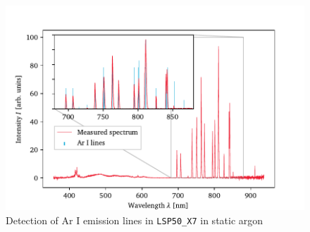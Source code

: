         \begin{figure}[h]
            \centering
            \includegraphics[]{assets/5 results/spectrum_LSP50_X7_lines}
            \caption{Detection of Ar I emission lines in \texttt{LSP50\_X7} in static argon}
            \label{fig:spectrum_lines}
        \end{figure}

